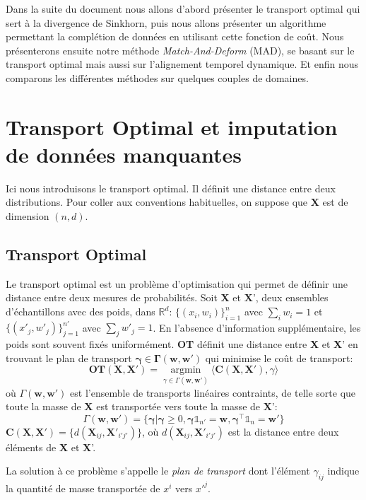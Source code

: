 \documentclass[acmsmall, natbib=false, nonacm]{acmart}
\begin{document}
Dans la suite du document nous allons d'abord présenter le transport optimal qui sert à la divergence de Sinkhorn,
puis nous allons présenter un algorithme permettant la complétion de données en utilisant cette fonction de coût.
Nous présenterons ensuite notre méthode \textit{Match-And-Deform} (MAD), se basant sur le transport optimal mais aussi sur l'alignement temporel dynamique.
Et enfin nous comparons les différentes méthodes sur quelques couples de domaines.

\section{Transport Optimal et imputation de données manquantes}
Ici nous introduisons le transport optimal. Il définit une distance entre deux distributions.
Pour coller aux conventions habituelles, on suppose que \textbf{X} est de dimension $(n, d)$.
\subsection{Transport Optimal}
Le transport optimal est un problème d’optimisation qui permet de définir une distance entre deux mesures de probabilités.
Soit \textbf{X} et \textbf{X}', deux ensembles d'échantillons avec des poids, dans $\mathbb{R}^{d}$:
$\{ (x_i, w_i) \}^{n}_{i = 1}$ avec $\sum_i w_i = 1$ et $\{ (x'_j, w'_j) \}^{n'}_{j = 1}$ avec $\sum_j w'_j = 1$.
En l'absence d'information supplémentaire, les poids sont souvent fixés uniformément. \textbf{OT} définit une distance entre \textbf{X} et \textbf{X}' 
en trouvant le plan de transport $\mathbf{\gamma \in \Gamma(w, w')}$ qui minimise le coût de transport:
$$\textbf{OT}(\textbf{X}, \textbf{X}') = \underset{\gamma \in \Gamma(\textbf{w}, \textbf{w}')}{\operatorname{\arg \min}} \langle \textbf{C}(\textbf{X}, \textbf{X}'), \gamma \rangle$$
où $\Gamma(\textbf{w}, \textbf{w}')$ est l'ensemble de transports linéaires contraints, de telle sorte que toute la masse de \textbf{X} est transportée vers toute la masse de \textbf{X}':
$$\Gamma(\textbf{w}, \textbf{w}') = \{ \mathbf{\gamma} | \mathbf{\gamma} \geq 0, \mathbf{\gamma} \mathds{1}_{n'} = \textbf{w}, \mathbf{\gamma}^{\top} \mathds{1}_{n} = \textbf{w}'\}$$
$\textbf{C}(\textbf{X}, \textbf{X}') = \{d(\textbf{X}_{ij}, \textbf{X}'_{i'j'})\}$, où $d(\textbf{X}_{ij}, \textbf{X}'_{i'j'})$ est la distance entre deux éléments de \textbf{X} et \textbf{X}'.

La solution à ce problème s'appelle le \textit{plan de transport} dont l'élément $\gamma_{ij}$ indique la quantité de masse 
transportée de $x^i$ vers $x'^j$.
\end{document}
